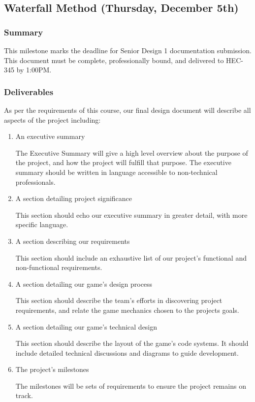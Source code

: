 \subsection{Waterfall Method (Thursday, December 5th)}

\subsubsection*{Summary}
This milestone marks the deadline for Senior Design 1 documentation submission. This document must be complete, professionally bound, and delivered to HEC-345 by 1:00PM.

\subsubsection*{Deliverables}
As per the requirements of this course, our final design document will describe
all aspects of the project including:
\begin{enumerate}
  \item An executive summary
  
  The Executive Summary will give a high level overview about the purpose of the project, and how the project will fulfill that purpose. The executive summary should be written in language accessible to non-technical professionals.

  \item A section detailing project significance
  
  This section should echo our executive summary in greater detail, with more specific language.

  \item A section describing our requirements
  
  This section should include an exhaustive list of our project's functional and non-functional requirements.

  \item A section detailing our game's design process
  
  This section should describe the team's efforts in discovering project requirements, and relate the game mechanics chosen to the projects goals.

  \item A section detailing our game's technical design
  
  This section should describe the layout of the game's code systems. It should include detailed technical discussions and diagrams to guide development.

  \item The project's milestones
  
  The milestones will be sets of requirements to ensure the project remains on track.

\end{enumerate}


